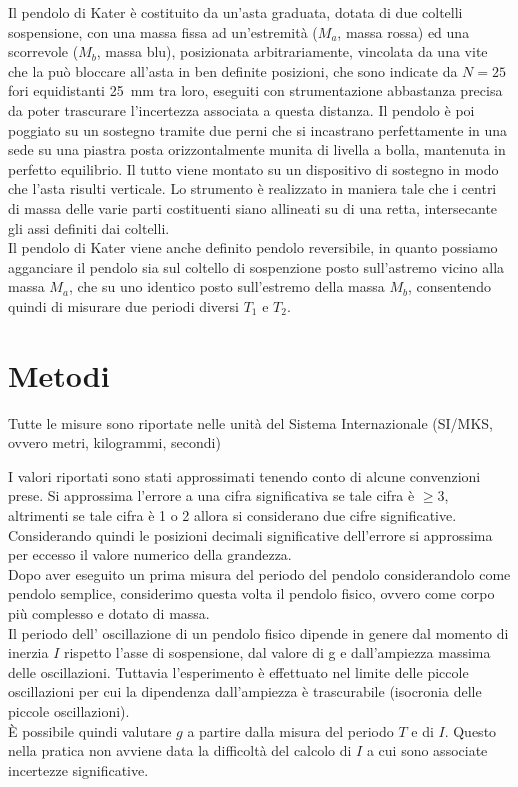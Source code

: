\documentclass[italian, a4paper, 10pt, twocolumn]{../../style/lab_unige}
\newcommand{\Ti}[1]{$T_{#1}$}
\newcommand{\Ma}{$M_a$}
\newcommand{\Mb}{$M_b$}
\begin{document}
    Il pendolo di Kater è costituito da un'asta graduata, dotata di due coltelli sospensione, con una massa fissa ad un'estremità (\Ma, massa rossa) ed una scorrevole (\Mb, massa blu), posizionata arbitrariamente, vincolata da una vite che la può bloccare all'asta in ben definite posizioni, che sono indicate da $N=25$ fori equidistanti 25~mm tra loro, eseguiti con strumentazione abbastanza precisa da poter trascurare l'incertezza associata a questa distanza. Il pendolo è poi poggiato su un sostegno tramite due perni che si incastrano perfettamente in una sede su una piastra posta orizzontalmente munita di livella a bolla, mantenuta in perfetto equilibrio. Il tutto viene montato su un dispositivo di sostegno in modo che l'asta risulti verticale. Lo strumento è realizzato in maniera tale che i centri di massa delle varie parti costituenti siano allineati su di una retta, intersecante gli assi definiti dai coltelli.\\
    Il pendolo di Kater viene anche definito pendolo reversibile, in quanto possiamo agganciare il pendolo sia sul coltello di sospenzione posto sull'astremo vicino alla massa \Ma, che su uno identico posto sull'estremo della massa \Mb, consentendo quindi di misurare due periodi diversi \Ti{1} e \Ti{2}. 

    \section{Metodi}
    \label{section:methods}
    Tutte le misure sono riportate nelle unità del Sistema Internazionale (SI/MKS, ovvero metri, kilogrammi, secondi)
    
    I valori riportati sono stati approssimati tenendo conto di alcune convenzioni prese. Si approssima l'errore a una cifra significativa se tale cifra è $\geqslant3$, altrimenti se tale cifra è 1 o 2 allora si considerano due cifre significative. Considerando quindi le posizioni decimali significative dell'errore si approssima per eccesso il valore numerico della grandezza.\\

    Dopo aver eseguito un prima misura del periodo del pendolo considerandolo come pendolo semplice, considerimo questa volta il pendolo fisico, ovvero come corpo più complesso e dotato di massa.\\
    Il periodo dell’ oscillazione di un pendolo fisico dipende in genere dal momento di inerzia $I$ rispetto l’asse di sospensione, dal valore di g e dall’ampiezza massima delle oscillazioni. Tuttavia l’esperimento è effettuato nel limite delle piccole oscillazioni per cui la dipendenza dall’ampiezza è trascurabile (isocronia delle piccole oscillazioni).\\
    È possibile quindi valutare $g$ a  partire dalla misura del periodo $T$ e di $I$.  Questo nella pratica non avviene data la difficoltà del calcolo di $I$ a cui sono associate incertezze significative.
\end{document}
